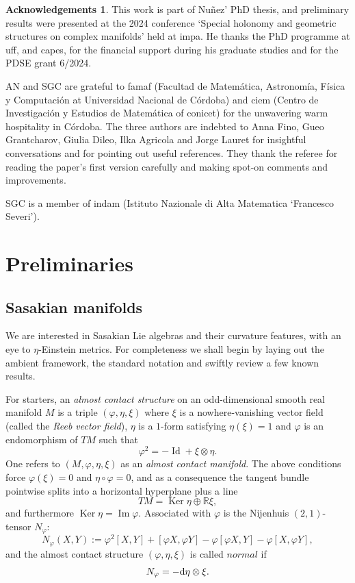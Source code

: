 \documentclass[12pt, twoside]{amsart}
\def\D{\textup{d}}
\def\R{\mathbb{R}}
\DeclareMathOperator{\Id}{\operatorname{Id}}
\renewcommand{\Im}{\operatorname{Im}}
\def\Ker{\operatorname{Ker}}
\theoremstyle{definition}
\newtheorem*{acknowledgements}{Acknowledgements}
\begin{document}
\begin{acknowledgements}
This work is part of Nu\~nez' PhD thesis, and preliminary results were presented at the  2024 conference `Special holonomy and geometric structures on complex manifolds' held at {\sc impa}. He thanks the PhD programme at {\sc uff}, and {\sc capes}, for the financial support during his graduate studies and for the PDSE grant 6/2024. \par
\quad AN and SGC are grateful to {\sc famaf} (Facultad de Matem{\'a}tica, Astronom{\'i}a, F{\'i}sica y Computaci{\'o}n at Universidad Nacional de C{\'o}rdoba) and {\sc ciem} (Centro de Investigaci{\'o}n y Estudios de Ma\-te\-m{\'a}\-tica of {\sc conicet}) for the unwavering warm hospitality in C{\'o}rdoba. 
The three authors are indebted to Anna Fino, Gueo Grantcharov, Giulia Dileo, Ilka Agricola and Jorge Lauret for insightful conversations and for pointing out useful references. They thank the referee for reading the paper's first version carefully and making spot-on comments and improvements.\par
SGC is a member of {\sc in}d{\sc am} (Istituto Nazionale di Alta Matematica `Francesco Severi'). 
\end{acknowledgements}

\bigbreak


\section{Preliminaries}

\subsection{Sasakian manifolds}\label{sec: sasakian}

We are interested in Sasakian Lie algebras and their curvature features, with an eye to $\eta$-Einstein metrics. For completeness we shall begin by laying out the ambient framework, the standard notation and swiftly review a few known results.
\smallbreak

For starters, an \textit{almost contact structure} on an odd-dimensional smooth real manifold $M$ is a triple $(\varphi,\eta,\xi)$ where $\xi$ is a nowhere-vanishing vector field (called the \textit{Reeb vector field}), $\eta$ is a $1$-form satisfying $\eta(\xi)=1$ and $\varphi$ is an endomorphism of $TM$ such that 
$$ 
 \varphi^{2}=-\Id +\xi \otimes \eta.
$$
One refers to $(M,\varphi,\eta,\xi)$ as an \textit{almost contact manifold}. 
The above conditions 
force $\varphi(\xi)=0$ and $\eta \circ\varphi=0$, and as a consequence  the tangent bundle pointwise splits into a horizontal hyperplane plus a line
\[TM=\Ker \eta\oplus \R\xi,\]
and furthermore $\Ker \eta=\Im\varphi$. Associated with $\varphi$ is the  Nijenhuis $(2,1)$-tensor $N_{\varphi}$:
\begin{equation}\label{Nijenhuis definicion}
N_{\varphi}(X,Y):=\varphi^{2}[X,Y]+[\varphi X,\varphi Y]-\varphi[\varphi X,Y]-\varphi[X,\varphi Y],
\end{equation}
and the almost contact structure $(\varphi, \eta, \xi)$ is called $\textit{normal}$ if 
$$
    N_{\varphi}=-\D\eta \otimes \xi.
$$
\end{document}
